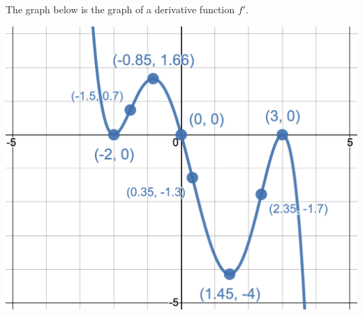 \documentclass{siproblemset}
\begin{document}
    \vspace{-1cm}
    \begin{multipartquestion}{The graph below is the graph of a derivative function $f'$.}
        \begin{multicols}{2}
            \begin{center}
                \includegraphics[width=\linewidth]{img/pt3-graph2}
            \end{center}
            \vfill\null
            \columnbreak
            \ \newline
            \ \newline
            \ \newline
        \end{multicols}
    \end{multipartquestion}
    
\end{document}
